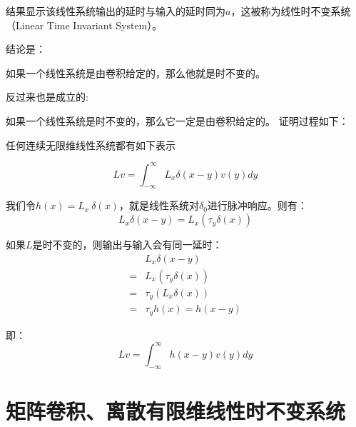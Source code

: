 结果显示该线性系统输出的延时与输入的延时同为$a$，这被称为线性时不变系统（Linear Time Invariant System）。

结论是：

如果一个线性系统是由卷积给定的，那么他就是时不变的。


反过来也是成立的:

如果一个线性系统是时不变的，那么它一定是由卷积给定的。
证明过程如下：

任何连续无限维线性系统都有如下表示

$$
	Lv = \int_{-\infty}^{\infty}L_x\delta(x-y)v(y)dy
$$

我们令$h(x)=L_x\ \delta(x)$，就是线性系统对$\delta_0$进行脉冲响应。则有：
$$
	L_x\delta(x-y) = L_x(\tau_y\delta(x))
$$

如果$L$是时不变的，则输出与输入会有同一延时：
\begin{align*}
	  & L_x\delta(x-y)       \\
	= & L_x(\tau_y\delta(x)) \\
	= & \tau_y(L_x\delta(x)) \\
	= & \tau_yh(x) = h(x-y)
\end{align*}

即：
$$
	Lv = \int_{-\infty}^{\infty}h(x-y)v(y)dy
$$
\section{矩阵卷积、离散有限维线性时不变系统}
